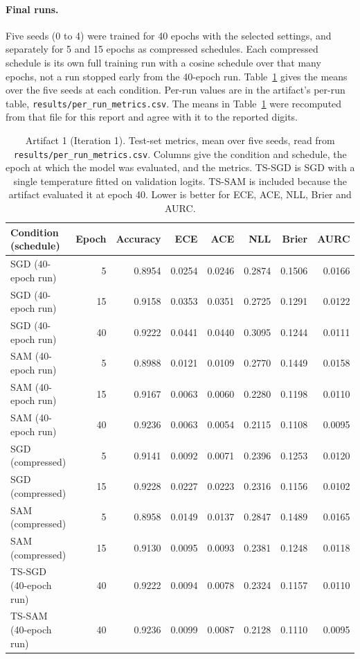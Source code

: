 \documentclass[11pt,letterpaper]{article}
\begin{document}
\paragraph{Final runs.} Five seeds (0 to 4) were trained for 40 epochs with the selected settings, and separately for 5 and 15 epochs as compressed schedules. Each compressed schedule is its own full training run with a cosine schedule over that many epochs, not a run stopped early from the 40-epoch run. Table~\ref{tab:main} gives the means over the five seeds at each condition. Per-run values are in the artifact's per-run table, \texttt{results/per\_run\_metrics.csv}. The means in Table~\ref{tab:main} were recomputed from that file for this report and agree with it to the reported digits.

\begin{table}[!htbp]
\centering
\footnotesize
\caption{Artifact 1 (Iteration 1). Test-set metrics, mean over five seeds, read from \texttt{results/per\_run\_metrics.csv}. Columns give the condition and schedule, the epoch at which the model was evaluated, and the metrics. TS-SGD is SGD with a single temperature fitted on validation logits. TS-SAM is included because the artifact evaluated it at epoch 40. Lower is better for ECE, ACE, NLL, Brier and AURC.}
\label{tab:main}
\begin{tabular}{lrrrrrrr}
\toprule
Condition (schedule) & Epoch & Accuracy & ECE & ACE & NLL & Brier & AURC \\
\midrule
SGD (40-epoch run) & 5 & 0.8954 & 0.0254 & 0.0246 & 0.2874 & 0.1506 & 0.0166 \\
SGD (40-epoch run) & 15 & 0.9158 & 0.0353 & 0.0351 & 0.2725 & 0.1291 & 0.0122 \\
SGD (40-epoch run) & 40 & 0.9222 & 0.0441 & 0.0440 & 0.3095 & 0.1244 & 0.0111 \\
SAM (40-epoch run) & 5 & 0.8988 & 0.0121 & 0.0109 & 0.2770 & 0.1449 & 0.0158 \\
SAM (40-epoch run) & 15 & 0.9167 & 0.0063 & 0.0060 & 0.2280 & 0.1198 & 0.0110 \\
SAM (40-epoch run) & 40 & 0.9236 & 0.0063 & 0.0054 & 0.2115 & 0.1108 & 0.0095 \\
SGD (compressed) & 5 & 0.9141 & 0.0092 & 0.0071 & 0.2396 & 0.1253 & 0.0120 \\
SGD (compressed) & 15 & 0.9228 & 0.0227 & 0.0223 & 0.2316 & 0.1156 & 0.0102 \\
SAM (compressed) & 5 & 0.8958 & 0.0149 & 0.0137 & 0.2847 & 0.1489 & 0.0165 \\
SAM (compressed) & 15 & 0.9130 & 0.0095 & 0.0093 & 0.2381 & 0.1248 & 0.0118 \\
TS-SGD (40-epoch run) & 40 & 0.9222 & 0.0094 & 0.0078 & 0.2324 & 0.1157 & 0.0110 \\
TS-SAM (40-epoch run) & 40 & 0.9236 & 0.0099 & 0.0087 & 0.2128 & 0.1110 & 0.0095 \\
\bottomrule
\end{tabular}
\end{table}
\end{document}

